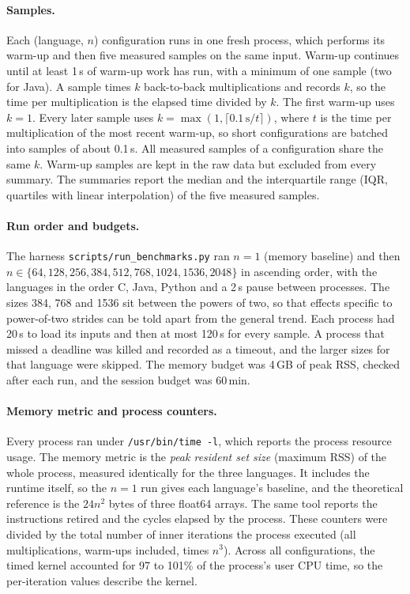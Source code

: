 \documentclass[11pt,a4paper]{article}
\begin{document}
\paragraph{Samples.} Each (language, $n$) configuration runs in one fresh
process, which performs its warm-up and then five measured samples on the same
input. Warm-up continues until at least 1\,s of warm-up work has run, with a
minimum of one sample (two for Java). A sample times $k$ back-to-back
multiplications and records $k$, so the time per multiplication is the elapsed
time divided by $k$. The first warm-up uses $k=1$. Every later sample uses
$k=\max(1,\lceil 0.1\,\text{s}/t\rceil)$, where $t$ is the time per multiplication
of the most recent warm-up, so short configurations are batched into samples of
about 0.1\,s. All measured samples of a configuration share the same $k$.
Warm-up samples are kept in the raw data but excluded from every summary.
The summaries report the median and the interquartile range (IQR, quartiles with
linear interpolation) of the five measured samples.

\paragraph{Run order and budgets.} The harness \texttt{scripts/run\_benchmarks.py}
ran $n=1$ (memory baseline) and then
$n\in\{64,128,256,384,512,768,1024,1536,2048\}$ in ascending order, with the
languages in the order C, Java, Python and a 2\,s pause between processes. The
sizes 384, 768 and 1536 sit between the powers of two, so that effects specific
to power-of-two strides can be told apart from the general trend. Each process
had 20\,s to load its inputs and then at most 120\,s for every sample. A process
that missed a deadline was killed and recorded as a timeout, and the larger sizes
for that language were skipped. The memory budget was 4\,GB of peak RSS, checked
after each run, and the session budget was 60\,min.

\paragraph{Memory metric and process counters.} Every process ran under
\texttt{/usr/bin/time -l}, which reports the process resource usage. The memory
metric is the \emph{peak resident set size} (maximum RSS) of the whole process,
measured identically for the three languages. It includes the runtime itself, so
the $n=1$ run gives each language's baseline, and the theoretical reference is
the $24n^2$ bytes of three float64 arrays. The same tool reports the
instructions retired and the cycles elapsed by the process. These counters were
divided by the total number of inner iterations the process executed (all
multiplications, warm-ups included, times $n^3$). Across all configurations, the
timed kernel accounted for 97 to 101\% of the process's user CPU time, so the
per-iteration values describe the kernel.
\end{document}

